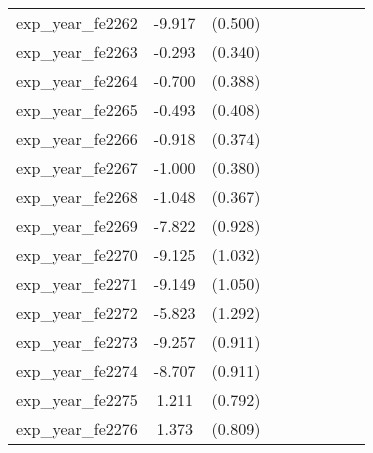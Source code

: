 {\begin{tabular}{l*{4}{cc}}
exp\_year\_fe2262&   -9.917\sym{***}&  (0.500)&                  &         &                  &         &                  &         \\
exp\_year\_fe2263&   -0.293         &  (0.340)&                  &         &                  &         &                  &         \\
exp\_year\_fe2264&   -0.700         &  (0.388)&                  &         &                  &         &                  &         \\
exp\_year\_fe2265&   -0.493         &  (0.408)&                  &         &                  &         &                  &         \\
exp\_year\_fe2266&   -0.918\sym{*}  &  (0.374)&                  &         &                  &         &                  &         \\
exp\_year\_fe2267&   -1.000\sym{**} &  (0.380)&                  &         &                  &         &                  &         \\
exp\_year\_fe2268&   -1.048\sym{**} &  (0.367)&                  &         &                  &         &                  &         \\
exp\_year\_fe2269&   -7.822\sym{***}&  (0.928)&                  &         &                  &         &                  &         \\
exp\_year\_fe2270&   -9.125\sym{***}&  (1.032)&                  &         &                  &         &                  &         \\
exp\_year\_fe2271&   -9.149\sym{***}&  (1.050)&                  &         &                  &         &                  &         \\
exp\_year\_fe2272&   -5.823\sym{***}&  (1.292)&                  &         &                  &         &                  &         \\
exp\_year\_fe2273&   -9.257\sym{***}&  (0.911)&                  &         &                  &         &                  &         \\
exp\_year\_fe2274&   -8.707\sym{***}&  (0.911)&                  &         &                  &         &                  &         \\
exp\_year\_fe2275&    1.211         &  (0.792)&                  &         &                  &         &                  &         \\
exp\_year\_fe2276&    1.373         &  (0.809)&                  &         &                  &         &                  &         \\

\end{tabular}}
